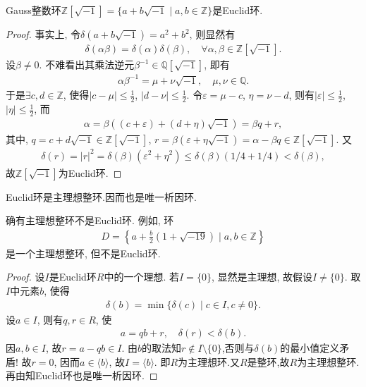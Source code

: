 \documentclass[../../main.tex]{subfiles}%
\begin{document}
\begin{example}
Gauss整数环$\mathbb{Z}[\sqrt{-1}]=\{a+b\sqrt{-1}\mid a,b\in\mathbb{Z}\}$是Euclid环.
\end{example}
\begin{proof}
事实上, 令$\delta(a+b\sqrt{-1})=a^2+b^2$, 则显然有
\begin{align*}
\delta(\alpha\beta)=\delta(\alpha)\delta(\beta),\quad \forall\alpha,\beta\in\mathbb{Z}[\sqrt{-1}].
\end{align*}
设$\beta\neq 0$. 不难看出其乘法逆元$\beta^{-1}\in\mathbb{Q}[\sqrt{-1}]$, 即有
\begin{align*}
\alpha\beta^{-1}=\mu+\nu\sqrt{-1},\quad \mu,\nu\in\mathbb{Q}.
\end{align*}
于是$\exists c,d\in\mathbb{Z}$, 使得$|c-\mu|\leqslant \frac{1}{2}$, $|d-\nu|\leqslant \frac{1}{2}$. 令$\varepsilon=\mu-c$, $\eta=\nu-d$, 则有$|\varepsilon|\leqslant \frac{1}{2}$, $|\eta|\leqslant \frac{1}{2}$, 而
\begin{align*}
\alpha=\beta((c+\varepsilon)+(d+\eta)\sqrt{-1})=\beta q+r,
\end{align*}
其中, $q=c+d\sqrt{-1}\in\mathbb{Z}[\sqrt{-1}]$, $r=\beta(\varepsilon+\eta\sqrt{-1})=\alpha-\beta q\in\mathbb{Z}[\sqrt{-1}]$. 又
\begin{align*}
\delta(r)=|r|^2=\delta(\beta)(\varepsilon^2+\eta^2)\leqslant\delta(\beta)(1/4+1/4)<\delta(\beta),
\end{align*}
故$\mathbb{Z}[\sqrt{-1}]$为Euclid环.
\end{proof}

\begin{theorem}\label{theorem:Euclid环必是主理想整环}
Euclid环是主理想整环.因而也是唯一析因环.
\end{theorem}
\begin{remark}
确有主理想整环不是Euclid环. 例如, 环
\begin{align*}
D=\left\{a+\frac{b}{2}(1+\sqrt{-19})\mid a,b\in\mathbb{Z}\right\}
\end{align*}
是一个主理想整环, 但不是Euclid环.
\end{remark}
\begin{proof}
设$I$是Euclid环$R$中的一个理想. 若$I=\{0\}$, 显然是主理想, 故假设$I\neq\{0\}$. 取$I$中元素$b$, 使得
\begin{align}
\delta(b)=\min\{\delta(c)\mid c\in I,c\neq 0\}.\label{eq:::09gj3ety4s34wygew3tygwef23g2.5.4}
\end{align}
设$a\in I$, 则有$q,r\in R$, 使
\begin{align*}
a=qb+r,\quad \delta(r)<\delta(b).
\end{align*}
因$a,b\in I$, 故$r=a-qb\in I$. 由$b$的取法知$r\notin I\setminus\{0\}$,否则与$\delta(b)$的最小值定义矛盾! 故$r=0$, 因而$a\in\langle b\rangle$, 故$I=\langle b\rangle$. 即$R$为主理想环.又$R$是整环,故$R$为主理想整环.再由知Euclid环也是唯一析因环.
\end{proof}
\end{document}

